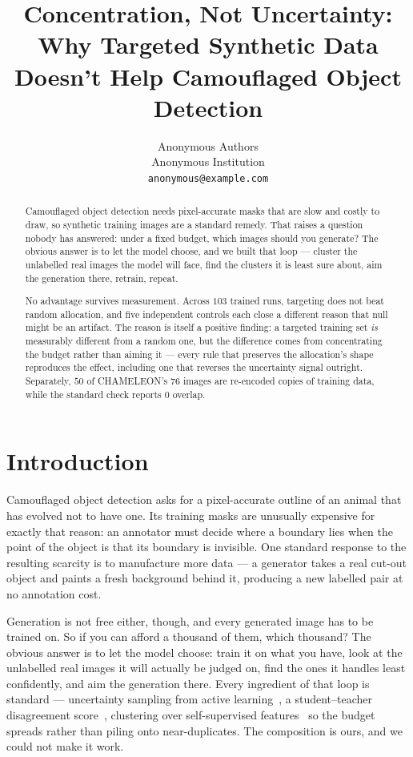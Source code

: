 \documentclass{article} %
\title{Concentration, Not Uncertainty: Why Targeted Synthetic Data Doesn't Help Camouflaged Object Detection}
\author{Anonymous Authors \\
Anonymous Institution \\
\texttt{anonymous@example.com}
}
\begin{document}
\maketitle

\begin{abstract}
Camouflaged object detection needs pixel-accurate masks that are slow and costly to draw, so
synthetic training images are a standard remedy. That raises a question nobody has answered: under a
fixed budget, which images should you generate? The obvious answer is to let the model choose, and
we built that loop --- cluster the unlabelled real images the model will face, find the clusters it
is least sure about, aim the generation there, retrain, repeat.

No advantage survives measurement. Across $103$ trained runs, targeting does not beat random
allocation, and five independent controls each close a different reason that null might be an
artifact. The reason is itself a positive finding: a targeted training set
\emph{is} measurably different from a random one, but the difference comes from concentrating the
budget rather than aiming it --- every rule that preserves the allocation's shape reproduces the
effect, including one that reverses the uncertainty signal outright. Separately, $50$ of
CHAMELEON's $76$ images are re-encoded copies of training data, while the standard check
reports $0$ overlap.
\end{abstract}

\section{Introduction}
\label{sec:intro}
Camouflaged object detection asks for a pixel-accurate outline of an animal that has evolved not to
have one. Its training masks are unusually expensive for exactly that reason: an annotator must
decide where a boundary lies when the point of the object is that its boundary is invisible. One
standard response to the resulting scarcity is to manufacture more data --- a generator takes a real
cut-out object and paints a fresh background behind it, producing a new labelled pair at no
annotation cost.

Generation is not free either, though, and every generated image has to be trained on. So if you can
afford a thousand of them, which thousand? The obvious answer is to let the model choose: train it
on what you have, look at the unlabelled real images it will actually be judged on, find the ones it
handles least confidently, and aim the generation there. Every ingredient of that loop is
standard --- uncertainty sampling from active learning~\citep{settles2009active}, a student--teacher
disagreement score~\citep{tarvainen2017mean}, clustering over self-supervised
features~\citep{oquab2024dinov2} so the budget spreads rather than piling onto near-duplicates. The
composition is ours, and we could not make it work.
\end{document}
